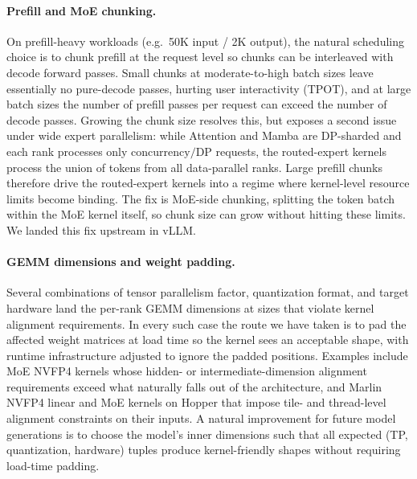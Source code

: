 \paragraph{Prefill and MoE chunking.}
On prefill-heavy workloads (e.g.\ 50K input / 2K output), the natural
scheduling choice is to chunk prefill at the request level so chunks
can be interleaved with decode forward passes. Small chunks at
moderate-to-high batch sizes leave essentially no pure-decode passes,
hurting user interactivity (TPOT), and at large batch sizes the number
of prefill passes per request can exceed the number of decode passes.
Growing the chunk size resolves this, but exposes a second issue under
wide expert parallelism: while Attention and Mamba are DP-sharded and
each rank processes only $\text{concurrency} / \text{DP}$ requests,
the routed-expert kernels process the union of tokens from all
data-parallel ranks. Large prefill chunks therefore drive the routed-expert kernels into a
regime where kernel-level resource limits become binding. The fix is
MoE-side chunking, splitting the token batch within the MoE kernel
itself, so chunk size can grow without hitting these limits. We
landed this fix upstream in vLLM.

\paragraph{GEMM dimensions and weight padding.}
Several combinations of tensor parallelism factor, quantization format,
and target hardware land the per-rank GEMM dimensions at sizes that
violate kernel alignment requirements. In every such case the route we
have taken is to pad the affected weight matrices at load time so the
kernel sees an acceptable shape, with runtime infrastructure adjusted
to ignore the padded positions. Examples include MoE NVFP4 kernels
whose hidden- or intermediate-dimension alignment requirements exceed
what naturally falls out of the architecture, and Marlin NVFP4 linear
and MoE kernels on Hopper that impose tile- and thread-level alignment
constraints on their inputs. A natural improvement for future model
generations is to choose the model's inner dimensions such that all
expected (TP, quantization, hardware) tuples produce kernel-friendly
shapes without requiring load-time padding.
